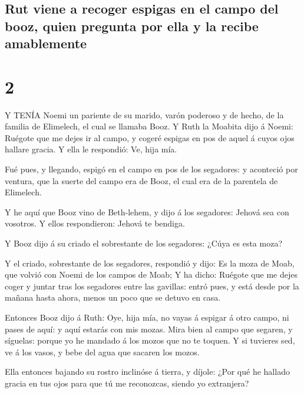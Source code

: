 \hypertarget{rut-viene-a-recoger-espigas-en-el-campo-del-booz-quien-pregunta-por-ella-y-la-recibe-amablemente}{%
\subsection{Rut viene a recoger espigas en el campo del booz, quien
pregunta por ella y la recibe
amablemente}\label{rut-viene-a-recoger-espigas-en-el-campo-del-booz-quien-pregunta-por-ella-y-la-recibe-amablemente}}

\hypertarget{section-1}{%
\section{2}\label{section-1}}

 Y TENÍA Noemi un pariente de su marido, varón poderoso y de
hecho, de la familia de Elimelech, el cual se llamaba Booz. 
Y Ruth la Moabita dijo á Noemi: Ruégote que me dejes ir al campo, y
cogeré espigas en pos de aquel á cuyos ojos hallare gracia. Y ella le
respondió: Ve, hija mía.

 Fué pues, y llegando, espigó en el campo en pos de los
segadores: y aconteció por ventura, que la suerte del campo era de Booz,
el cual era de la parentela de Elimelech.

 Y he aquí que Booz vino de Beth-lehem, y dijo á los
segadores: Jehová sea con vosotros. Y ellos respondieron: Jehová te
bendiga.

 Y Booz dijo á su criado el sobrestante de los segadores:
¿Cúya es esta moza?

 Y el criado, sobrestante de los segadores, respondió y
dijo: Es la moza de Moab, que volvió con Noemi de los campos de Moab;
 Y ha dicho: Ruégote que me dejes coger y juntar tras los
segadores entre las gavillas: entró pues, y está desde por la mañana
hasta ahora, menos un poco que se detuvo en casa.

 Entonces Booz dijo á Ruth: Oye, hija mía, no vayas á
espigar á otro campo, ni pases de aquí: y aquí estarás con mis mozas.
 Mira bien al campo que segaren, y síguelas: porque yo he
mandado á los mozos que no te toquen. Y si tuvieres sed, ve á los vasos,
y bebe del agua que sacaren los mozos.

 Ella entonces bajando su rostro inclinóse á tierra, y
díjole: ¿Por qué he hallado gracia en tus ojos para que tú me
reconozcas, siendo yo extranjera?

